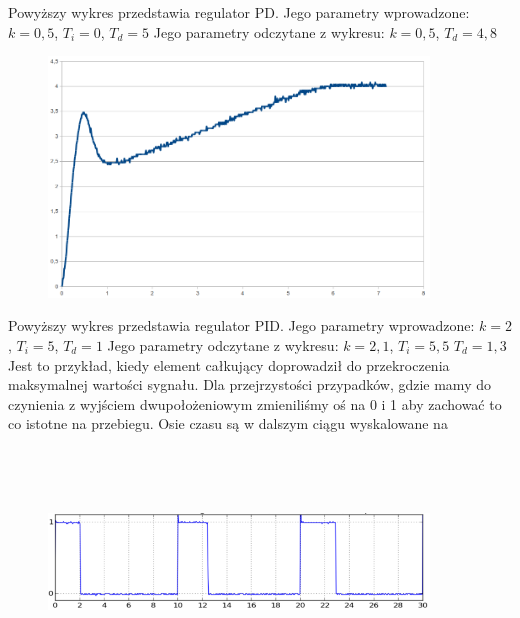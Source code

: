 \documentclass[a4paper, 12pt]{article}
\begin{document}
		Powyższy wykres przedstawia regulator PD. \newline
		Jego parametry wprowadzone: $k = 0,5$, $T_i = 0$, $T_d = 5$ \newline
		Jego parametry odczytane z wykresu: $k = 0,5$, $T_d = 4,8$
		\begin{figure}[H]
			\centering
			\includegraphics[width=0.9\textwidth]{./grafika/PIDI.png}
		\end{figure}
		Powyższy wykres przedstawia regulator PID. \newline
		Jego parametry wprowadzone: $k = 2$, $T_i = 5$, $T_d = 1$ \newline
		Jego parametry odczytane z wykresu: $k = 2,1$, $T_i = 5,5$ $T_d = 1,3$
		\newline
		Jest to przykład, kiedy element całkujący doprowadził do przekroczenia maksymalnej wartości sygnału.
		\newpage
		Dla przejrzystości przypadków, gdzie mamy do czynienia z wyjściem dwupołożeniowym zmieniliśmy oś na 0 i 1 aby zachować to co istotne na przebiegu. Osie czasu są w dalszym ciągu wyskalowane na 
		\begin{figure}[H]
			\centering
			\includegraphics[width=0.9\textwidth, height=6cm]{./grafika/cudo1.png}
		\end{figure}
\end{document}
